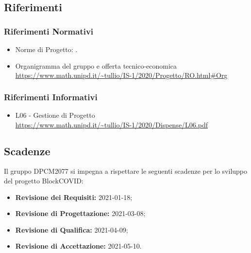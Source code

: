 \subsection{Riferimenti}
\subsubsection{Riferimenti Normativi}
\begin{itemize}
	\item Norme di Progetto: .
    \item{Organigramma del gruppo e offerta tecnico-economica} \\
 \url{https://www.math.unipd.it/~tullio/IS-1/2020/Progetto/RO.html#Org}
\end{itemize}
\subsubsection{Riferimenti Informativi}
\begin{itemize}
	\item {L06 - Gestione di Progetto} \\
 \url{https://www.math.unipd.it/~tullio/IS-1/2020/Dispense/L06.pdf}
\end{itemize}

\subsection{Scadenze}
Il gruppo DPCM2077 si impegna a rispettare le seguenti scadenze per lo sviluppo del progetto BlockCOVID:
\begin{itemize}
	\item \textbf{Revisione dei Requisiti:} 2021-01-18; \\
	\item \textbf{Revisione di Progettazione:} 2021-03-08; \\
	\item \textbf{Revisione di Qualifica:} 2021-04-09; \\
	\item \textbf{Revisione di Accettazione:} 2021-05-10. \\
\end{itemize}




